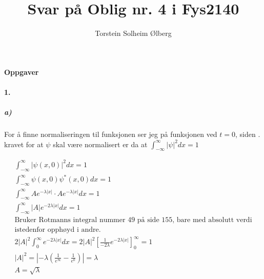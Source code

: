 \documentclass[11pt, A4paper,norsk]{article}
\author{Torstein Solheim Ølberg}
\title{Svar på Oblig nr. 4 i Fys2140}
\begin{document}
\maketitle
	\begin{center}
\Large \textbf{Oppgaver}
	\end{center}









		\paragraph{1.}
			\subparagraph{a)}
				\begin{flushleft}
For å finne normaliseringen til funksjonen ser jeg på funksjonen ved $t = 0$, siden . kravet for at $\psi$ skal være normalisert er da at $\int_{- \infty}^{\infty} | \psi |^2 dx = 1$
				\end{flushleft}
				\begin{gather*}
\int_{- \infty}^{\infty} |\psi(x, 0)|^2 dx = 1 \\
\int_{- \infty}^{\infty} \psi(x, 0) \psi^{*}(x, 0) dx = 1 \\
\int_{- \infty}^{\infty} Ae^{- \lambda |x|} \cdot Ae^{- \lambda |x|} dx = 1 \\
\int_{- \infty}^{\infty} |A| e^{- 2 \lambda |x|} dx = 1 \\
\text{Bruker Rotmanns integral nummer 49 på side 155, bare med absolutt verdi} \\
\text{istedenfor opphøyd i andre.} \\
2 |A|^2 \int_{0}^{\infty} e^{- 2 \lambda |x|} dx = 2 |A|^2 \left[ \frac{1}{-2 \lambda} e^{- 2 \lambda |x|} \right]_{0}^{\infty} = 1 \\
|A|^2 = \left| - \lambda \left( \frac{1}{e^{\infty}} - \frac{1}{e^{0}} \right) \right| = \lambda \\
A = \sqrt{\lambda}
				\end{gather*}
\end{document}
